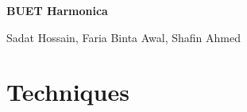 \appendix

\vspace{0.5cm}
\centering
{\Huge \textbf{BUET Harmonica} \par}
\vspace{0.5cm}
{\centering \Large Sadat Hossain, Faria Binta Awal, Shafin Ahmed}
\vspace{1cm}

\chapter{Techniques}

